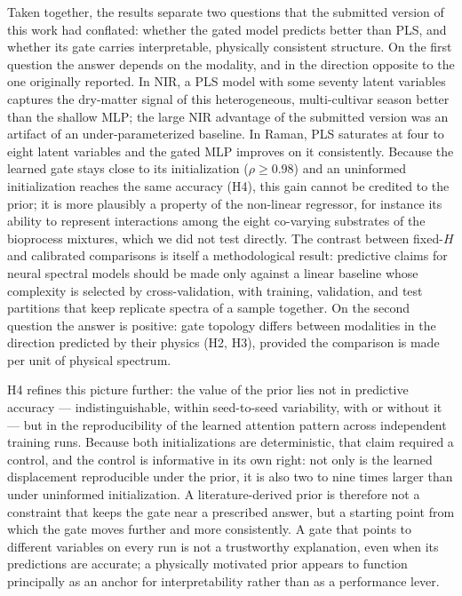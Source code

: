 \documentclass[preprint,12pt]{elsarticle}
\begin{document}
Taken together, the results separate two questions that the submitted version of this work had conflated: whether the gated model predicts better than PLS, and whether its gate carries interpretable, physically consistent structure. On the first question the answer depends on the modality, and in the direction opposite to the one originally reported. In NIR, a PLS model with some seventy latent variables captures the dry-matter signal of this heterogeneous, multi-cultivar season better than the shallow MLP; the large NIR advantage of the submitted version was an artifact of an under-parameterized baseline. In Raman, PLS saturates at four to eight latent variables and the gated MLP improves on it consistently. Because the learned gate stays close to its initialization ($\rho\geq0.98$) and an uninformed initialization reaches the same accuracy (H4), this gain cannot be credited to the prior; it is more plausibly a property of the non-linear regressor, for instance its ability to represent interactions among the eight co-varying substrates of the bioprocess mixtures, which we did not test directly. The contrast between fixed-$H$ and calibrated comparisons is itself a methodological result: predictive claims for neural spectral models should be made only against a linear baseline whose complexity is selected by cross-validation, with training, validation, and test partitions that keep replicate spectra of a sample together. On the second question the answer is positive: gate topology differs between modalities in the direction predicted by their physics (H2, H3), provided the comparison is made per unit of physical spectrum.

H4 refines this picture further: the value of the prior lies not in predictive accuracy --- indistinguishable, within seed-to-seed variability, with or without it --- but in the reproducibility of the learned attention pattern across independent training runs. Because both initializations are deterministic, that claim required a control, and the control is informative in its own right: not only is the learned displacement reproducible under the prior, it is also two to nine times larger than under uninformed initialization. A literature-derived prior is therefore not a constraint that keeps the gate near a prescribed answer, but a starting point from which the gate moves further and more consistently. A gate that points to different variables on every run is not a trustworthy explanation, even when its predictions are accurate; a physically motivated prior appears to function principally as an anchor for interpretability rather than as a performance lever.
\end{document}
